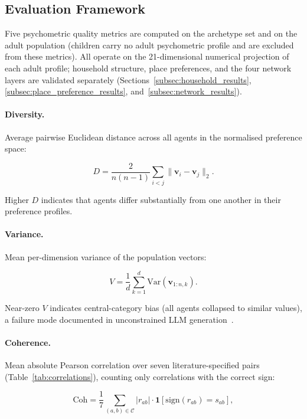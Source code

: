\documentclass[a4paper,12pt]{article}
\begin{document}
\subsection{Evaluation Framework}
\label{subsec:metrics}

Five psychometric quality metrics are computed on the archetype set and on the
adult population (children carry no adult psychometric profile and are excluded
from these metrics). All operate on the 21-dimensional numerical projection of
each adult profile; household structure, place preferences, and the four network
layers are validated separately (Sections~\ref{subsec:household_results},
\ref{subsec:place_preference_results}, and~\ref{subsec:network_results}).

\paragraph{Diversity.}
Average pairwise Euclidean distance across all agents in the normalised
preference space:

\begin{equation}
  D = \frac{2}{n(n-1)} \sum_{i < j} \|\mathbf{v}_i - \mathbf{v}_j\|_2.
  \label{eq:diversity}
\end{equation}

Higher $D$ indicates that agents differ substantially from one another
in their preference profiles.

\paragraph{Variance.}
Mean per-dimension variance of the population vectors:

\begin{equation}
  V = \frac{1}{d}\sum_{k=1}^{d} \mathrm{Var}(\mathbf{v}_{1:n,k}).
  \label{eq:variance}
\end{equation}

Near-zero $V$ indicates central-category bias (all agents collapsed to
similar values), a failure mode documented in unconstrained LLM
generation~\cite{argyle2023outstuffing}.

\paragraph{Coherence.}
Mean absolute Pearson correlation over seven literature-specified pairs
(Table~\ref{tab:correlations}), counting only correlations with the
correct sign:

\begin{equation}
  \text{Coh} = \frac{1}{7}\sum_{(a,b) \in \mathcal{C}}
               |r_{ab}| \cdot \mathbf{1}[\mathrm{sign}(r_{ab}) = s_{ab}],
  \label{eq:coherence}
\end{equation}
\end{document}
